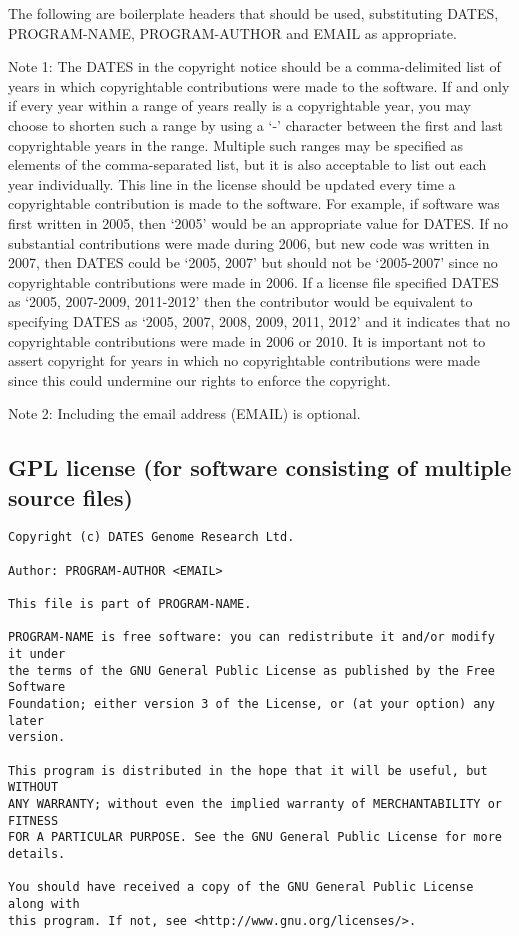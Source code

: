 \documentclass[10pt,a4paper]{article}
\begin{document}
The following are boilerplate headers that should be used, substituting DATES, PROGRAM-NAME, PROGRAM-AUTHOR and EMAIL as appropriate.

Note 1: The DATES in the copyright notice should be a comma-delimited list of years in which 
copyrightable contributions were made to the software. If and only if every year within a range 
of years really is a copyrightable year, you may choose to shorten such a range by using a `-' 
character between the first and last copyrightable years in the range. Multiple such ranges may 
be specified as elements of the comma-separated list, but it is also acceptable to list out each 
year individually. This line in the license should be updated every time a copyrightable 
contribution is made to the software. For example, if software was first written in 2005, then 
`2005' would be an appropriate value for DATES. If no substantial contributions were made 
during 2006, but new code was written in 2007, then DATES could be `2005, 2007' but should 
not be `2005-2007' since no copyrightable contributions were made in 2006. If a license file 
specified DATES as `2005, 2007-2009, 2011-2012' then the contributor would be equivalent to 
specifying DATES as `2005, 2007, 2008, 2009, 2011, 2012' and it indicates that no copyrightable 
contributions were made in 2006 or 2010. It is important not to assert copyright for years in 
which no copyrightable contributions were made since this could undermine our rights to 
enforce the copyright. 
 
Note 2: Including the email address (EMAIL) is optional. 

\subsection{GPL license (for software consisting of multiple source files)}

\begin{boilerplate}
\begin{verbatim}
Copyright (c) DATES Genome Research Ltd. 
 
Author: PROGRAM-AUTHOR <EMAIL> 

This file is part of PROGRAM-NAME. 

PROGRAM-NAME is free software: you can redistribute it and/or modify it under 
the terms of the GNU General Public License as published by the Free Software 
Foundation; either version 3 of the License, or (at your option) any later 
version. 
 
This program is distributed in the hope that it will be useful, but WITHOUT 
ANY WARRANTY; without even the implied warranty of MERCHANTABILITY or FITNESS 
FOR A PARTICULAR PURPOSE. See the GNU General Public License for more 
details. 
 
You should have received a copy of the GNU General Public License along with 
this program. If not, see <http://www.gnu.org/licenses/>. 
\end{verbatim}
\end{boilerplate}
\end{document}

